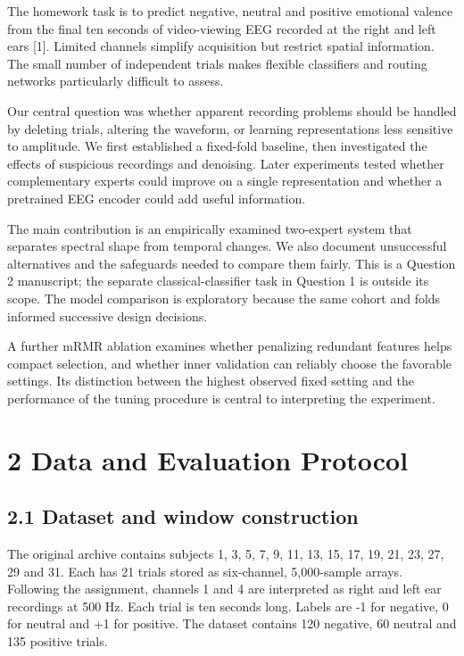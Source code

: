 \documentclass[10pt,a4paper]{article}
\begin{document}
The homework task is to predict negative, neutral and positive emotional valence from the final ten seconds of video-viewing EEG recorded at the right and left ears [1]. Limited channels simplify acquisition but restrict spatial information. The small number of independent trials makes flexible classifiers and routing networks particularly difficult to assess.


Our central question was whether apparent recording problems should be handled by deleting trials, altering the waveform, or learning representations less sensitive to amplitude. We first established a fixed-fold baseline, then investigated the effects of suspicious recordings and denoising. Later experiments tested whether complementary experts could improve on a single representation and whether a pretrained EEG encoder could add useful information.


The main contribution is an empirically examined two-expert system that separates spectral shape from temporal changes. We also document unsuccessful alternatives and the safeguards needed to compare them fairly. This is a Question 2 manuscript; the separate classical-classifier task in Question 1 is outside its scope. The model comparison is exploratory because the same cohort and folds informed successive design decisions.


A further mRMR ablation examines whether penalizing redundant features helps compact selection, and whether inner validation can reliably choose the favorable settings. Its distinction between the highest observed fixed setting and the performance of the tuning procedure is central to interpreting the experiment.


\section*{2 Data and Evaluation Protocol}

\subsection*{2.1 Dataset and window construction}

The original archive contains subjects 1, 3, 5, 7, 9, 11, 13, 15, 17, 19, 21, 23, 27, 29 and 31. Each has 21 trials stored as six-channel, 5,000-sample arrays. Following the assignment, channels 1 and 4 are interpreted as right and left ear recordings at 500 Hz. Each trial is ten seconds long. Labels are -1 for negative, 0 for neutral and +1 for positive. The dataset contains 120 negative, 60 neutral and 135 positive trials.
\end{document}
